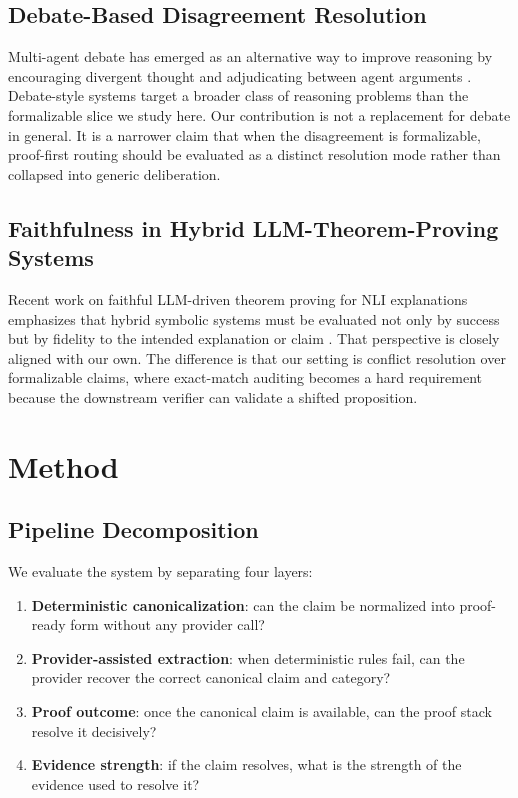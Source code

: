 \documentclass[11pt]{article}
\begin{document}
\subsection{Debate-Based Disagreement Resolution}

Multi-agent debate has emerged as an alternative way to improve reasoning by
encouraging divergent thought and adjudicating between agent arguments
\citep{liang2024mad}. Debate-style systems target a broader class of reasoning
problems than the formalizable slice we study here. Our contribution is not a
replacement for debate in general. It is a narrower claim that when the
disagreement is formalizable, proof-first routing should be evaluated as a
distinct resolution mode rather than collapsed into generic deliberation.

\subsection{Faithfulness in Hybrid LLM-Theorem-Proving Systems}

Recent work on faithful LLM-driven theorem proving for NLI explanations
emphasizes that hybrid symbolic systems must be evaluated not only by success
but by fidelity to the intended explanation or claim \citep{quan2025faithful}.
That perspective is closely aligned with our own. The difference is that our
setting is conflict resolution over formalizable claims, where exact-match
auditing becomes a hard requirement because the downstream verifier can validate
a shifted proposition.

\section{Method}

\subsection{Pipeline Decomposition}

We evaluate the system by separating four layers:

\begin{enumerate}
  \item \textbf{Deterministic canonicalization}: can the claim be normalized
  into proof-ready form without any provider call?
  \item \textbf{Provider-assisted extraction}: when deterministic rules fail,
  can the provider recover the correct canonical claim and category?
  \item \textbf{Proof outcome}: once the canonical claim is available, can the
  proof stack resolve it decisively?
  \item \textbf{Evidence strength}: if the claim resolves, what is the
  strength of the evidence used to resolve it?
\end{enumerate}
\end{document}
